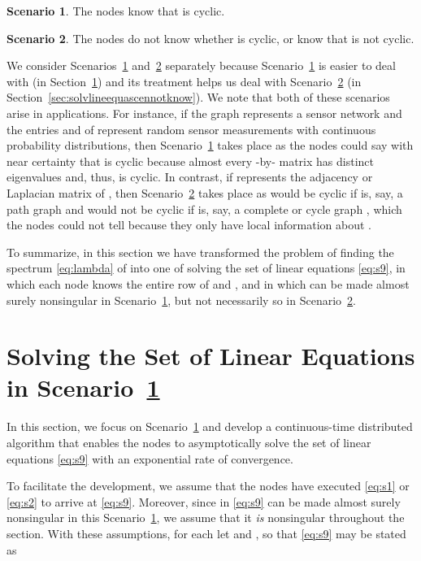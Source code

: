 \documentclass[11pt]{article}
\theoremstyle{plain}
\theoremstyle{definition}
\newtheorem{scenario}{Scenario}
\theoremstyle{remark}
\begin{document}
\begin{scenario}\label{sce:know}
The nodes know that  is cyclic.
\end{scenario}

\begin{scenario}\label{sce:notknow}
The nodes do not know whether  is cyclic, or know that  is not cyclic.
\end{scenario}

We consider Scenarios~\ref{sce:know} and~\ref{sce:notknow} separately because Scenario~\ref{sce:know} is easier to deal with (in Section~\ref{sec:solvlineequascenknow}) and its treatment helps us deal with Scenario~\ref{sce:notknow} (in Section~\ref{sec:solvlineequascennotknow}). We note that both of these scenarios arise in applications. For instance, if the graph  represents a sensor network and the entries   and   of  represent random sensor measurements with continuous probability distributions, then Scenario~\ref{sce:know} takes place as the nodes could say with near certainty that  is cyclic because almost every -by- matrix has  distinct eigenvalues and, thus, is cyclic. In contrast, if  represents the adjacency or Laplacian matrix of , then Scenario~\ref{sce:notknow} takes place as  would be cyclic if  is, say, a path graph \cite{Chung97} and would not be cyclic if  is, say, a complete or cycle graph \cite{Chung97}, which the nodes could not tell because they only have local information about .

To summarize, in this section we have transformed the problem of finding the spectrum \eqref{eq:lambda} of  into one of solving the set of linear equations \eqref{eq:s9}, in which each node  knows the entire row  of  and , and in which  can be made almost surely nonsingular in Scenario~\ref{sce:know}, but not necessarily so in Scenario~\ref{sce:notknow}.

\section{Solving the Set of Linear Equations in Scenario~\ref{sce:know}}\label{sec:solvlineequascenknow}

In this section, we focus on Scenario~\ref{sce:know} and develop a continuous-time distributed algorithm that enables the nodes to asymptotically solve the set of linear equations \eqref{eq:s9} with an exponential rate of convergence.

To facilitate the development, we assume that the nodes have executed \eqref{eq:s1} or \eqref{eq:s2} to arrive at \eqref{eq:s9}. Moreover, since  in \eqref{eq:s9} can be made almost surely nonsingular in this Scenario~\ref{sce:know}, we assume that it {\em is} nonsingular throughout the section. With these assumptions, for each  let  and , so that \eqref{eq:s9} may be stated as
\end{document}
